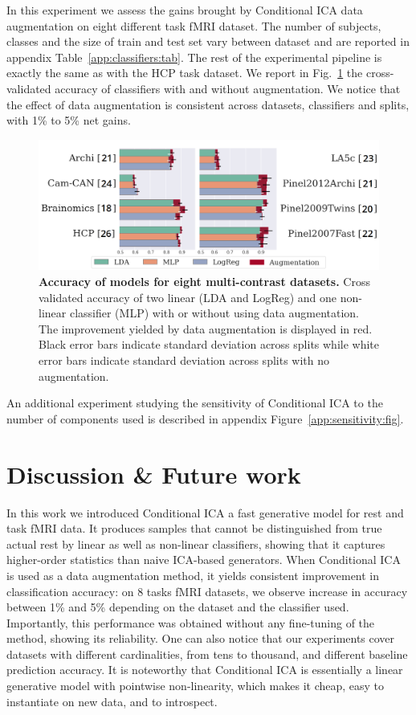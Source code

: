 In this experiment we assess the gains brought by Conditional ICA data
augmentation on eight different task fMRI dataset. The number of subjects,
classes and the size of train and test set vary between dataset and are reported
in appendix Table~\ref{app:classifiers:tab}. The rest of the experimental pipeline is exactly the same as with the HCP task dataset.
We report in Fig.~\ref{Fig4} the cross-validated accuracy of
classifiers with and without augmentation.
We notice that the effect of data augmentation is
consistent across datasets, classifiers and splits, with 1\% to 5\% net gains.
%
\begin{figure}
  \centering
  \includegraphics[width=\textwidth]{figures/condica/accuracy_all_datasets_v5.png}
\caption{\textbf{Accuracy of models for eight multi-contrast datasets.} Cross
  validated accuracy of two linear (LDA and LogReg) and one non-linear
  classifier (MLP) with or without using data augmentation.
  The improvement yielded by data augmentation is displayed in red.
  Black error bars indicate standard deviation across splits while white error bars indicate standard deviation across splits with no augmentation.}
\label{Fig4}
\end{figure}
%
An additional experiment studying the sensitivity of Conditional ICA to the
number of components used is described in appendix Figure~\ref{app:sensitivity:fig}.

\section{Discussion \& Future work}
In this work we introduced Conditional ICA a fast generative model
for rest and task fMRI data. It produces samples that cannot be distinguished from true actual rest by 
linear as well as non-linear classifiers, showing that it captures higher-order statistics than naive ICA-based generators.
%
When Conditional ICA is used as a data augmentation method, it yields consistent
improvement in classification accuracy: on 8 tasks fMRI datasets, we observe
increase in accuracy between 1\% and 5\% depending on the dataset and the
classifier used.
Importantly, this performance was obtained without any fine-tuning of
the method, showing its reliability. One can also notice that our experiments cover datasets with different cardinalities, from tens to thousand, and different baseline prediction accuracy.
It is noteworthy that Conditional ICA is essentially a linear
generative model with pointwise non-linearity, which makes it cheap,
easy to instantiate on new data, and to introspect.

